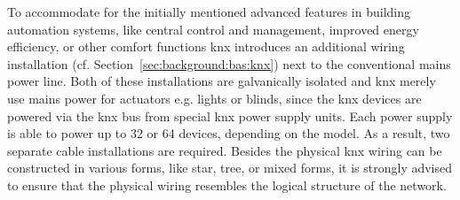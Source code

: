 To accommodate for the initially mentioned advanced features in building automation systems, like central control and management, improved energy efficiency, or other comfort functions \gls{knx} introduces an additional wiring installation (cf. Section~\ref{sec:background:bas:knx}) next to the conventional mains power line. 
Both of these installations are galvanically isolated and \gls{knx} merely use mains power for actuators e.g. lights or blinds, since the \gls{knx} devices are powered via the \gls{knx} bus from special \gls{knx} power supply units.
Each power supply is able to power up to 32 or 64 devices, depending on the model.
As a result, two separate cable installations are required.
Besides the physical \gls{knx} wiring can be constructed in various forms, like star, tree, or mixed forms, it is strongly advised to ensure that the physical wiring resembles the logical structure of the network. \parencite{Sokollik2017,Merz2009} 

